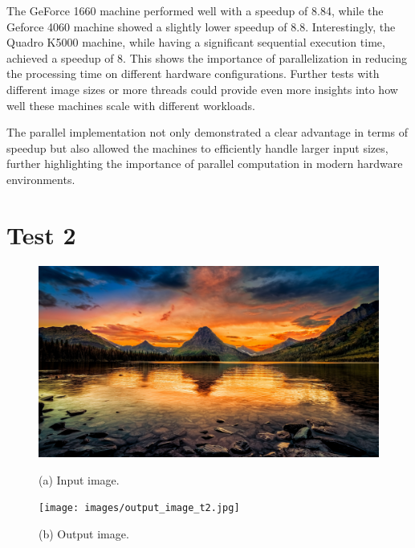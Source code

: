 The GeForce 1660 machine performed well with a speedup of 8.84, while the Geforce 4060 machine showed a slightly lower speedup of 8.8. Interestingly, the Quadro K5000 machine, while having a significant sequential execution time, achieved a speedup of 8. This shows the importance of parallelization in reducing the processing time on different hardware configurations. Further tests with different image sizes or more threads could provide even more insights into how well these machines scale with different workloads.

The parallel implementation not only demonstrated a clear advantage in terms of speedup but also allowed the machines to efficiently handle larger input sizes, further highlighting the importance of parallel computation in modern hardware environments.

\section{Test 2}
\begin{figure}[H]
    \centering
    \begin{minipage}[b]{0.45\textwidth}
        \centering
        \includegraphics[width=\textwidth]{images/input_image_t2.jpg}
        \caption{(a) Input image.}
        \label{fig:test_2_input}
    \end{minipage}
    \hfill
    \begin{minipage}[b]{0.45\textwidth}
        \centering
        \texttt{[image: images/output\_image\_t2.jpg]}
        \caption{(b) Output image.}
        \label{fig:test_2_output}
    \end{minipage}
    \end{figure}


